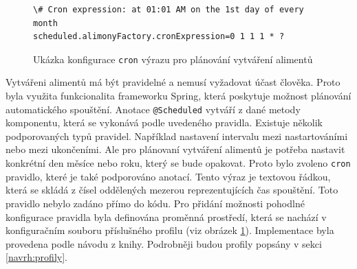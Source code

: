            \begin{figure}
                \begin{verbatim}
\# Cron expression: at 01:01 AM on the 1st day of every month
scheduled.alimonyFactory.cronExpression=0 1 1 1 * ?
                \end{verbatim}
                \caption{Ukázka konfigurace \texttt{cron} výrazu pro plánování vytváření alimentů} 
                \label{code:cron-expression}
            \end{figure}
            Vytvářeni alimentů má být pravidelné a nemusí vyžadovat účast člověka. Proto byla využita funkcionalita frameworku Spring, která poskytuje možnost plánování automatického spouštění.\cite{spring-scheduling} Anotace \verb|@Scheduled| vytváří z dané metody komponentu, která se vykonává podle uvedeného pravidla. Existuje několik podporovaných typů pravidel. 
            Například nastavení intervalu mezi nastartováními nebo mezi ukončeními. Ale pro plánovaní vytváření alimentů je potřeba nastavit konkrétní den měsíce nebo roku, který se bude opakovat. Proto bylo zvoleno \verb|cron| pravidlo, které je také podporováno anotací.\cite{cron-expression} Tento výraz je textovou řádkou, která se skládá z čísel oddělených mezerou reprezentujících čas spouštění.
            Toto pravidlo nebylo zadáno přímo do kódu. Pro přidání možnosti pohodlné konfigurace pravidla byla definována proměnná prostředí, která se nachází v konfiguračním souboru příslušného profilu (viz obrázek \ref{code:cron-expression}). Implementace byla provedena podle návodu z knihy\cite{sbr:spring-task-scheduling}. Podrobněji budou profily popsány v sekci \ref{navrh:profily}.
         
